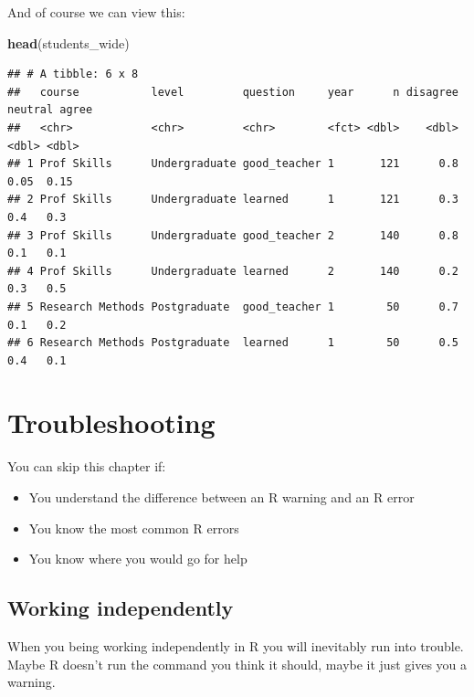\documentclass[
]{book}
\newenvironment{Shaded}{\begin{snugshade}}{\end{snugshade}}
\newcommand{\KeywordTok}[1]{\textcolor[rgb]{0.13,0.29,0.53}{\textbf{#1}}}
\newcommand{\NormalTok}[1]{#1}
\begin{document}
And of course we can view this:

\begin{Shaded}
\begin{Highlighting}[]
\KeywordTok{head}\NormalTok{(students_wide)}
\end{Highlighting}
\end{Shaded}

\begin{verbatim}
## # A tibble: 6 x 8
##   course           level         question     year      n disagree neutral agree
##   <chr>            <chr>         <chr>        <fct> <dbl>    <dbl>   <dbl> <dbl>
## 1 Prof Skills      Undergraduate good_teacher 1       121      0.8    0.05  0.15
## 2 Prof Skills      Undergraduate learned      1       121      0.3    0.4   0.3 
## 3 Prof Skills      Undergraduate good_teacher 2       140      0.8    0.1   0.1 
## 4 Prof Skills      Undergraduate learned      2       140      0.2    0.3   0.5 
## 5 Research Methods Postgraduate  good_teacher 1        50      0.7    0.1   0.2 
## 6 Research Methods Postgraduate  learned      1        50      0.5    0.4   0.1
\end{verbatim}

\hypertarget{trouble}{%
\chapter{Troubleshooting}\label{trouble}}

\begin{los}
You can skip this chapter if:

\begin{itemize}
\item
  You understand the difference between an R warning and an R error
\item
  You know the most common R errors
\item
  You know where you would go for help
\end{itemize}
\end{los}

\hypertarget{working-independently}{%
\section{Working independently}\label{working-independently}}

When you being working independently in R you will inevitably run into trouble. Maybe R doesn't run the command you think it should, maybe it just gives you a warning.
\end{document}
